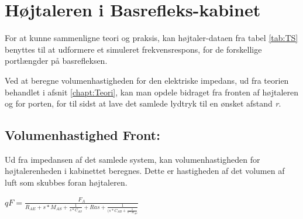 \section{Højtaleren i Basrefleks-kabinet}

For at kunne sammenligne teori og praksis, kan højtaler-dataen fra tabel \ref{tab:TS} benyttes til at udformere et simuleret frekvensrespons, for de forskellige portlængder på basrefleksen.

Ved at beregne volumenhastigheden for den elektriske impedans, ud fra teorien behandlet i afsnit \ref{chapt:Teori}, kan man opdele bidraget fra fronten af højtaleren og for porten, for til sidst at lave det samlede lydtryk til en ønsket afstand \textit{r}. 


\subsection{Volumenhastighed Front:}
\label{sec:sim_calc}

Ud fra impedansen af det samlede system, kan volumenhastigheden for højtalerenheden i kabinettet beregnes. Dette er hastigheden af det volumen af luft som skubbes foran højtaleren. 

{\large\(qF=\)}{\Large \(\frac{F_A}{R_{AE}+s*M_{AS}+\frac{1}{s*C_{AS}}+Ras+\frac{1}{(s*C_{AB}+\frac{1}{s*M_{AP}}}}\) }







